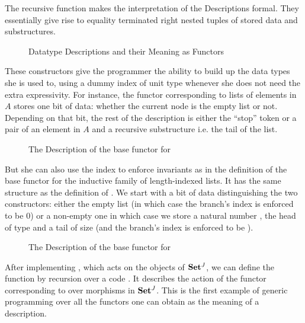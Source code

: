 The recursive function  makes the interpretation of the
Descriptions formal. They essentially give rise to equality
terminated right nested tuples of stored data and substructures.

\begin{figure}[h]
\hspace{-1em}\begin{minipage}{0.50\textwidth}
\end{minipage}\hspace{2em}
\begin{minipage}{0.40\textwidth}
\end{minipage}
\caption{Datatype Descriptions and their Meaning as Functors}\label{figure:desc}
\end{figure}

These constructors give the programmer the ability to build up the data
types she is used to, using a dummy index of unit type whenever she does
not need the extra expressivity. For instance, the functor corresponding
to lists of elements in $A$ stores one bit of data: whether the current
node is the empty list or not. Depending on that bit, the rest of the
description is either the ``stop'' token or a pair of an element in $A$
and a recursive substructure i.e. the tail of the list.

\begin{figure}[h]
\caption{The Description of the base functor for  }\label{figure:listD}
\end{figure}

But she can also use the index to enforce invariants as in the definition
of the base functor for the    inductive family of
length-indexed lists. It has the same structure as the definition of .
We start with a bit of data distinguishing the two constructors: either
the empty list (in which case the branch's index is enforced to be $0$) or a
non-empty one in which case we store a natural number , the head of type
 and a tail of size  (and the branch's index is enforced to be
 ).

\begin{figure}[h]
\caption{The Description of the base functor for   }\label{figure:vecD}
\end{figure}

After implementing , which acts on the objects of $\mathbf{Set}{}^J$, we can
define the function  by recursion over a code . It describes
the action of the functor corresponding to  over morphisms in $\mathbf{Set}{}^J$.
This is the first example of generic programming over all the functors one can
obtain as the meaning of a description.

